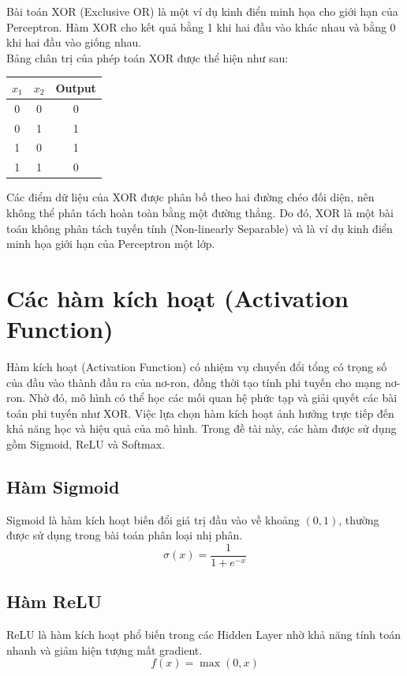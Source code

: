 \documentclass[12pt,a4paper]{report}
\begin{document}
Bài toán XOR (Exclusive OR) là một ví dụ kinh điển minh họa cho giới hạn của Perceptron. Hàm XOR cho kết quả bằng 1 khi hai đầu vào khác nhau và bằng 0 khi hai đầu vào giống nhau. \\
Bảng chân trị của phép toán XOR được thể hiện như sau:

\begin{table}[H]
\centering
\begin{tabular}{|c|c|c|}
\hline
$x_1$ & $x_2$ & Output \\
\hline
0 & 0 & 0 \\
0 & 1 & 1 \\
1 & 0 & 1 \\
1 & 1 & 0 \\
\hline
\end{tabular}
\end{table}

Các điểm dữ liệu của XOR được phân bố theo hai đường chéo đối diện, nên không thể phân tách hoàn toàn bằng một đường thẳng. Do đó, XOR là một bài toán không phân tách tuyến tính (Non-linearly Separable) và là ví dụ kinh điển minh họa giới hạn của Perceptron một lớp.

\section{Các hàm kích hoạt (Activation Function)}
Hàm kích hoạt (Activation Function) có nhiệm vụ chuyển đổi tổng có trọng số của đầu vào thành đầu ra của nơ-ron, đồng thời tạo tính phi tuyến cho mạng nơ-ron. Nhờ đó, mô hình có thể học các mối quan hệ phức tạp và giải quyết các bài toán phi tuyến như XOR. Việc lựa chọn hàm kích hoạt ảnh hưởng trực tiếp đến khả năng học và hiệu quả của mô hình. Trong đề tài này, các hàm được sử dụng gồm Sigmoid, ReLU và Softmax.

\subsection{Hàm Sigmoid}
Sigmoid là hàm kích hoạt biến đổi giá trị đầu vào về khoảng $(0,1)$, thường được sử dụng trong bài toán phân loại nhị phân.
\begin{equation}
    \sigma(x) = \frac{1}{1 + e^{-x}}
\end{equation}

\subsection{Hàm ReLU}
ReLU là hàm kích hoạt phổ biến trong các Hidden Layer nhờ khả năng tính toán nhanh và giảm hiện tượng mất gradient.
\begin{equation}
    f(x) = \max(0, x)
\end{equation}
\end{document}

